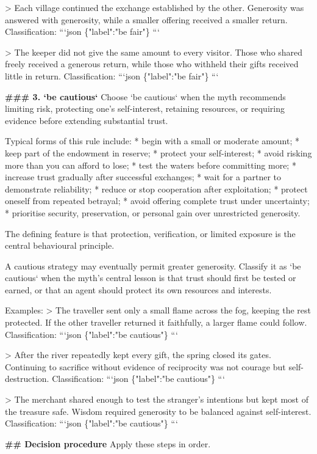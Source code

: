 \begin{promptboxcompact}
> Each village continued the exchange established by the other. Generosity was answered with generosity, while a smaller offering received a smaller return. Classification: ```json \{"label":"be fair"\} ```

> The keeper did not give the same amount to every visitor. Those who shared freely received a generous return, while those who withheld their gifts received little in return. Classification: ```json \{"label":"be fair"\} ```

\textbf{\#\#\# 3. `be cautious`} Choose `be cautious` when the myth recommends limiting risk, protecting one’s self-interest, retaining resources, or requiring evidence before extending substantial trust.

Typical forms of this rule include: * begin with a small or moderate amount; * keep part of the endowment in reserve; * protect your self-interest; * avoid risking more than you can afford to lose; * test the waters before committing more; * increase trust gradually after successful exchanges; * wait for a partner to demonstrate reliability; * reduce or stop cooperation after exploitation; * protect oneself from repeated betrayal; * avoid offering complete trust under uncertainty; * prioritise security, preservation, or personal gain over unrestricted generosity.

The defining feature is that protection, verification, or limited exposure is the central behavioural principle.

A cautious strategy may eventually permit greater generosity. Classify it as `be cautious` when the myth’s central lesson is that trust should first be tested or earned, or that an agent should protect its own resources and interests.

Examples: > The traveller sent only a small flame across the fog, keeping the rest protected. If the other traveller returned it faithfully, a larger flame could follow. Classification: ```json \{"label":"be cautious"\} ```

> After the river repeatedly kept every gift, the spring closed its gates. Continuing to sacrifice without evidence of reciprocity was not courage but self-destruction. Classification: ```json \{"label":"be cautious"\} ```

> The merchant shared enough to test the stranger’s intentions but kept most of the treasure safe. Wisdom required generosity to be balanced against self-interest. Classification: ```json \{"label":"be cautious"\} ```

\textbf{\#\# Decision procedure} Apply these steps in order.


\end{promptboxcompact}
